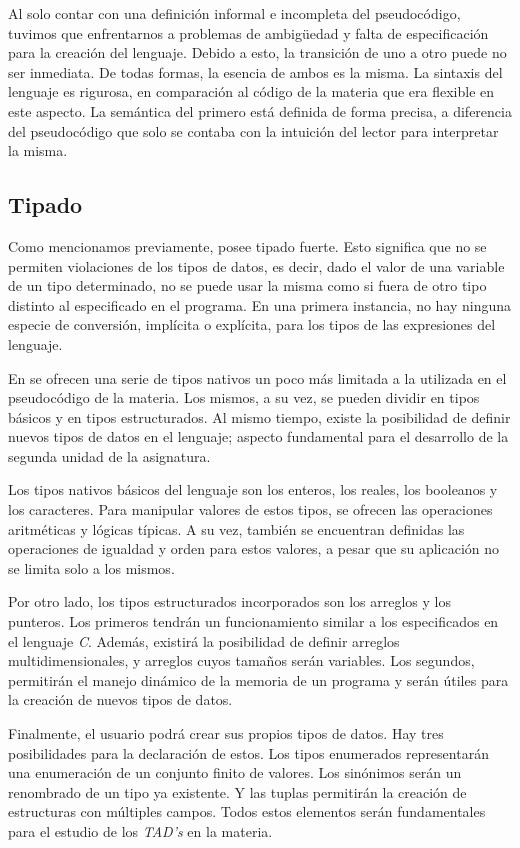 Al solo contar con una definición informal e incompleta del pseudocódigo, tuvimos que enfrentarnos a problemas de ambigüedad y falta de especificación para la creación del lenguaje.
Debido a esto, la transición de uno a otro puede no ser inmediata.
De todas formas, la esencia de ambos es la misma.
La sintaxis del lenguaje es rigurosa, en comparación al código de la materia que era flexible en este aspecto.
La semántica del primero está definida de forma precisa, a diferencia del pseudocódigo que solo se contaba con la intuición del lector para interpretar la misma.

\subsection{Tipado}

Como mencionamos previamente, \Lenguaje{} posee tipado fuerte.
Esto significa que no se permiten violaciones de los tipos de datos, es decir, dado el valor de una variable de un tipo determinado, no se puede usar la misma como si fuera de otro tipo distinto al especificado en el programa.
En una primera instancia, no hay ninguna especie de conversión, implícita o explícita, para los tipos de las expresiones del lenguaje.

En \Lenguaje{} se ofrecen una serie de tipos nativos un poco más limitada a la utilizada en el pseudocódigo de la materia.
Los mismos, a su vez, se pueden dividir en tipos básicos y en tipos estructurados.
Al mismo tiempo, existe la posibilidad de definir nuevos tipos de datos en el lenguaje; aspecto fundamental para el desarrollo de la segunda unidad de la asignatura.

Los tipos nativos básicos del lenguaje son los enteros, los reales, los booleanos y los caracteres.
Para manipular valores de estos tipos, se ofrecen las operaciones aritméticas y lógicas típicas.
A su vez, también se encuentran definidas las operaciones de igualdad y orden para estos valores, a pesar que su aplicación no se limita solo a los mismos.

Por otro lado, los tipos estructurados incorporados son los arreglos y los punteros.
Los primeros tendrán un funcionamiento similar a los especificados en el lenguaje \textit{C}.
Además, existirá la posibilidad de definir arreglos multidimensionales, y arreglos cuyos tamaños serán variables.
Los segundos, permitirán el manejo dinámico de la memoria de un programa y serán útiles para la creación de nuevos tipos de datos.

Finalmente, el usuario podrá crear sus propios tipos de datos.
Hay tres posibilidades para la declaración de estos.
Los tipos enumerados representarán una enumeración de un conjunto finito de valores.
Los sinónimos serán un renombrado de un tipo ya existente.
Y las tuplas permitirán la creación de estructuras con múltiples campos.
Todos estos elementos serán fundamentales para el estudio de los \textit{TAD's} en la materia.


